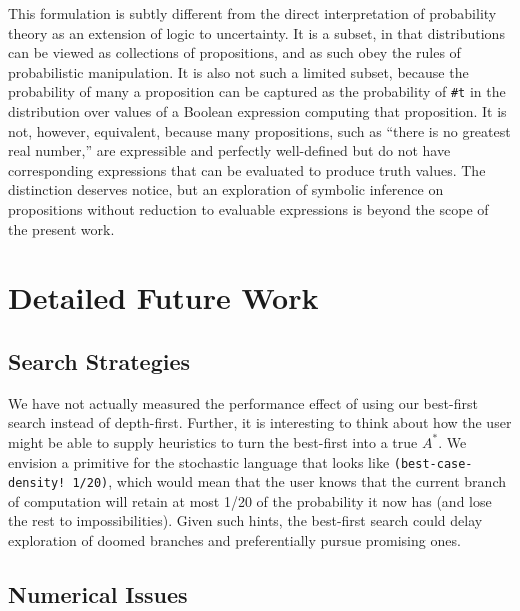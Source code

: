\documentclass[12pt]{article}
\newcommand{\code}[1]{\texttt{#1}}
\begin{document}
This formulation is subtly different from the direct interpretation of
probability theory as an extension of logic to uncertainty.  It is a
subset, in that distributions can be viewed as collections of
propositions, and as such obey the rules of probabilistic
manipulation.  It is also not such a limited subset, because the
probability of many a proposition can be captured as the probability
of \code{\#t} in the distribution over values of a Boolean expression
computing that proposition.  It is not, however, equivalent, because
many propositions, such as ``there is no greatest real number,'' are
expressible and perfectly well-defined but do not have corresponding
expressions that can be evaluated to produce truth values.  The
distinction deserves notice, but an exploration of symbolic inference
on propositions without reduction to evaluable expressions is beyond
the scope of the present work.

\section{Detailed Future Work}
\label{future}

\subsection{Search Strategies}
\label{search}
We have not actually measured the performance effect of using our
best-first search instead of depth-first.  Further, it is interesting
to think about how the user might be able to supply heuristics to turn
the best-first into a true $A^*$.  We envision a primitive for the
stochastic language that looks like \code{(best-case-density!\ 1/20)},
which would mean that the user knows that the current branch of
computation will retain at most 1/20 of the probability it now has
(and lose the rest to impossibilities).  Given such hints, the
best-first search could delay exploration of doomed branches and
preferentially pursue promising ones.

\subsection{Numerical Issues}
\label{numerical}
\end{document}
